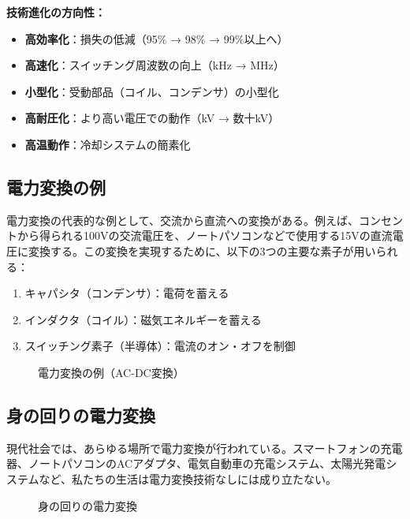 \begin{screen}
\textbf{技術進化の方向性：}

\begin{itemize}
\item \textbf{高効率化}：損失の低減（95\% → 98\% → 99\%以上へ）
\item \textbf{高速化}：スイッチング周波数の向上（kHz → MHz）
\item \textbf{小型化}：受動部品（コイル、コンデンサ）の小型化
\item \textbf{高耐圧化}：より高い電圧での動作（kV → 数十kV）
\item \textbf{高温動作}：冷却システムの簡素化
\end{itemize}
\end{screen}

\subsection{電力変換の例}

電力変換の代表的な例として、交流から直流への変換がある。例えば、コンセントから得られる100Vの交流電圧を、ノートパソコンなどで使用する15Vの直流電圧に変換する。この変換を実現するために、以下の3つの主要な素子が用いられる：

\begin{enumerate}
\item キャパシタ（コンデンサ）：電荷を蓄える
\item インダクタ（コイル）：磁気エネルギーを蓄える
\item スイッチング素子（半導体）：電流のオン・オフを制御
\end{enumerate}

\begin{figure}[H]
\centering
{}
\caption{電力変換の例（AC-DC変換）}
\label{fig:ac_dc_conversion}
\end{figure}

\subsection{身の回りの電力変換}

現代社会では、あらゆる場所で電力変換が行われている。スマートフォンの充電器、ノートパソコンのACアダプタ、電気自動車の充電システム、太陽光発電システムなど、私たちの生活は電力変換技術なしには成り立たない。

\begin{figure}[H]
\centering
{}
\caption{身の回りの電力変換}
\label{fig:power_conversion_examples}
\end{figure}

